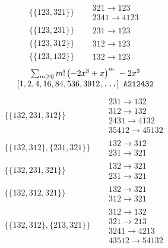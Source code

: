 \begin{tiny}
\begin{align}
\\
\{\{123, 321\}\}
\quad
&
\begin{matrix}
321 \to 123\\2341 \to 4123
\end{matrix}
\\
\{\{123, 231\}\}
\quad
&
\begin{matrix}
231 \to 123
\end{matrix}
\\
\{\{123, 312\}\}
\quad
&
\begin{matrix}
312 \to 123
\end{matrix}
\\
\{\{123, 132\}\}
\quad
&
\begin{matrix}
132 \to 123
\end{matrix}
\end{align}
$$
\begin{matrix}
\sum_{m \geq 0} m! \left(
-2 x^{3} + x
\right)^m
\ 
-2 x^{3}
\\
\left[1, 2, 4, 16, 84, 536, 3912, \text{\texttt{...}}\right]
\ 
\texttt{A212432}
\end{matrix}
$$
\vspace{-1em}
\begin{align}
\{\{132, 231, 312\}\}
\quad
&
\begin{matrix}
231 \to 132\\312 \to 132\\2431 \to 4132\\35412 \to 45132
\end{matrix}
\\
\{\{132, 312\}, \{231, 321\}\}
\quad
&
\begin{matrix}
132 \to 312\\231 \to 321
\end{matrix}
\\
\{\{132, 231, 321\}\}
\quad
&
\begin{matrix}
132 \to 321\\231 \to 321
\end{matrix}
\\
\{\{132, 312, 321\}\}
\quad
&
\begin{matrix}
132 \to 321\\312 \to 321
\end{matrix}
\\
\{\{132, 312\}, \{213, 321\}\}
\quad
&
\begin{matrix}
312 \to 132\\321 \to 213\\3241 \to 4213\\43512 \to 54132

\end{matrix}
\end{align}
\end{tiny}
